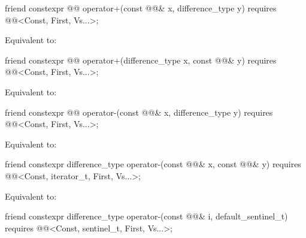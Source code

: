 %
\begin{itemdecl}
friend constexpr @@ operator+(const @@& x, difference_type y)
  requires @@<Const, First, Vs...>;
\end{itemdecl}

\begin{itemdescr}
\pnum
\effects
Equivalent to: 
\end{itemdescr}

%
\begin{itemdecl}
friend constexpr @@ operator+(difference_type x, const @@& y)
  requires @@<Const, First, Vs...>;
\end{itemdecl}

\begin{itemdescr}
\pnum
\effects
Equivalent to: 
\end{itemdescr}

%
\begin{itemdecl}
friend constexpr @@ operator-(const @@& x, difference_type y)
  requires @@<Const, First, Vs...>;
\end{itemdecl}

\begin{itemdescr}
\pnum
\effects
Equivalent to: 
\end{itemdescr}

%
\begin{itemdecl}
friend constexpr difference_type operator-(const @@& x, const @@& y)
  requires @@<Const, iterator_t, First, Vs...>;
\end{itemdecl}

\begin{itemdescr}
\pnum
\effects
Equivalent to: 
\end{itemdescr}

%
\begin{itemdecl}
friend constexpr difference_type operator-(const @@& i, default_sentinel_t)
  requires @@<Const, sentinel_t, First, Vs...>;
\end{itemdecl}

